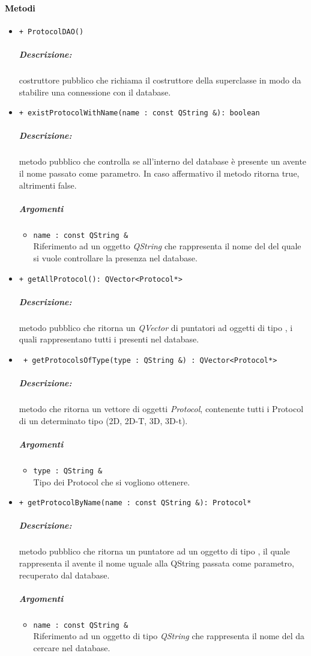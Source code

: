 \paragraph{\textcolor{black}{Metodi\\}}
\begin{itemize}
	\item \color{blue}\verb!+ ProtocolDAO()!
	\color{black} 
	\subparagraph{Descrizione:} costruttore pubblico che richiama il costruttore della superclasse in modo da stabilire una connessione con il database.
	
	\item \color{blue}\verb!+ existProtocolWithName(name : const QString &): boolean!
	\color{black} 
	\subparagraph{Descrizione:} metodo pubblico che controlla se all'interno del database è presente un \protocol{} avente il nome passato come parametro. In caso affermativo il metodo ritorna true, altrimenti false.
	\subparagraph{Argomenti}
	\begin{itemize}
		\item \color{RoyalPurple}\verb!name : const QString &! \\ 
		\color{black}Riferimento ad un oggetto \textsl{QString} che rappresenta il nome del \protocol{} del quale si vuole controllare la presenza nel database.
	\end{itemize}
	
	\item \color{blue}\verb!+ getAllProtocol(): QVector<Protocol*>!\\
	\color{black} 
	\subparagraph{Descrizione:} metodo pubblico che ritorna un \textsl{QVector} di puntatori ad oggetti di tipo \protocol{}, i quali rappresentano tutti i \protocol{} presenti nel database.
	
	\item \color{blue}\verb! + getProtocolsOfType(type : QString &) : QVector<Protocol*>!
	\color{black}
	\subparagraph{Descrizione:} metodo che ritorna un vettore di oggetti \textsl{Protocol}, contenente tutti i Protocol\g{} di un determinato tipo (2D, 2D-T, 3D, 3D-t).
	\subparagraph{Argomenti}	
		\begin{itemize}
			\item \color{RoyalPurple}\verb!type : QString &!\\
			\color{black}Tipo dei Protocol\g{} che si vogliono ottenere.
		\end{itemize}
		
	\item \color{blue}\verb!+ getProtocolByName(name : const QString &): Protocol*!
	\color{black} 
	\subparagraph{Descrizione:} metodo pubblico che ritorna un puntatore ad un oggetto di tipo \protocol{}, il quale rappresenta il \protocol{} avente il nome uguale alla QString passata come parametro, recuperato dal database.
	\subparagraph{Argomenti}
		\begin{itemize}
			\item \color{RoyalPurple}\verb!name : const QString &! \\ 
			\color{black}Riferimento ad un oggetto di tipo \textsl{QString} che rappresenta il nome del \protocol{} da cercare nel database.
		\end{itemize}
		

\end{itemize}
